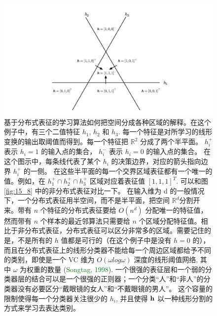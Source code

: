 \begin{figure}[h!]
\centering
\includegraphics[width=13cm]{fig/chap15/15_7.png}
\caption{基于分布式表征的学习算法如何把空间分成各种区域的解释。在这个例子中，有三个二值特征 $h_1$, $h_2$ 和 $h_3$. 每一个特征是对所学习的线形变换的输出取阈值而得到。每一个特征把 $\mathbb{R}^2$ 分成了两个半平面。 $ h^+_i$ 表示 $h_i = 1$ 的输入点的集合， $h^-_i$ 表示 $h_i = 0$ 的输入点的集合。 在这个图示中，每条线代表了某个 $h_i$ 的决策边界，对应的箭头指向边界 $h^+_i$ 的一侧。 在这些半平面的每一个交界区域表征都有一个唯一的值。例如，在 $h^+_1 \cap h^+_2 \cap h^+_3$ 区域对应着表征值 $[1,1,1]^T$. 可以和图 \ref{fig:15_8} 中的非分布式表征对比一下。 在输入维为 d 的一般情况下，一个分布式表征用半空间，而不是半平面，把空间 $\mathbb{R}^d$分割开来。带有 $n$ 个特征的分布式表征要给 $O(n^d)$ 分配唯一的特征值，然而带有 $n$ 个样本的最近邻算法只需要给 $n$ 个区域分配特征值。相比于非分布式表征，分布式表征可以区分非常多的区域。需要记住的是，不是所有的 $h$ 值都是可行的（在这个例子中是没有 $h = 0$ 的），而且在分布式表征上的线形分类器不能给每一个周边区域都给予不同的类别，即使是一个 VC 维为 $O(\omega log \omega)$ 深度的线形阈值网络, 其中 $\omega$ 为权重的数量 (\textcolor{green}{Songtag, 1998}). 一个很强的表征层和一个弱的分类器层的结合可以是一个很强的正则器；一个分类“人”和“非人”的分类器没有必要区分“戴眼镜的女人”和“不戴眼镜的男人”。 这个容量的限制使得每一个分类器关注很少的 $h_i$, 并且使得 $\bf h$ 以一种线形分割的方式来学习去表达类别。}
\label{fig:15_7}
\end{figure}

